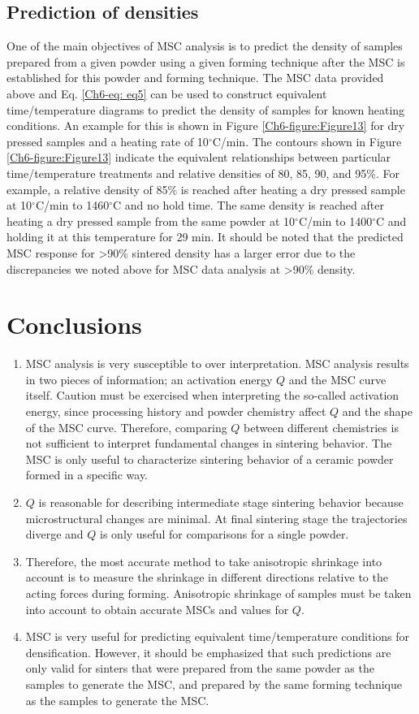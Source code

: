 \subsection{Prediction of densities}
One of the main objectives of MSC analysis is to predict the density of samples prepared from a given powder using a given forming technique after the MSC is established for this powder and forming technique. The MSC data provided above and Eq. \ref{Ch6-eq: eq5} can be used to construct equivalent time/temperature diagrams to predict the density of samples for known heating conditions. An example for this is shown in Figure \ref{Ch6-figure:Figure13} for dry pressed samples and a heating rate of 10$^{\circ}$C/min. The contours shown in Figure \ref{Ch6-figure:Figure13} indicate the equivalent relationships between particular time/temperature treatments and relative densities of 80, 85, 90, and 95\%. For example, a relative density of 85\% is reached after heating a dry pressed sample at 10$^{\circ}$C/min to 1460$^{\circ}$C and no hold time. The same density is reached after heating a dry pressed sample from the same powder at 10$^{\circ}$C/min to 1400$^{\circ}$C and holding it at this temperature for 29 min. It should be noted that the predicted MSC response for >90\% sintered density has a larger error due to the discrepancies we noted above for MSC data analysis at >90\% density. 

\section{Conclusions}

\begin{enumerate}
	\item MSC analysis is very susceptible to over interpretation. MSC analysis results in two pieces of information; an activation energy $Q$ and the MSC curve itself. Caution must be exercised when interpreting the so-called activation energy, since processing history and powder chemistry affect $Q$ and the shape of the MSC curve. Therefore, comparing $Q$ between different chemistries is not sufficient to interpret fundamental changes in sintering behavior. The MSC is only useful to characterize sintering behavior of a ceramic powder formed in a specific way.
	\item $Q$ is reasonable for describing intermediate stage sintering behavior because microstructural changes are minimal. At final sintering stage the trajectories diverge and $Q$ is only useful for comparisons for a single powder.
	\item Therefore, the most accurate method to take anisotropic shrinkage into account is to measure the shrinkage in different directions relative to the acting forces during forming. Anisotropic shrinkage of samples must be taken into account to obtain accurate MSCs and values for $Q$.
	\item MSC is very useful for predicting equivalent time/temperature conditions for densification. However, it should be emphasized that such predictions are only valid for sinters that were prepared from the same powder as the samples to generate the MSC, and prepared by the same forming technique as the samples to generate the MSC. 
\end{enumerate}


